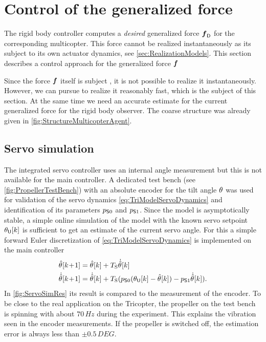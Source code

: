 \section{Control of the generalized force}\label{sec:RealizationForceVectorControl}
The rigid body controller computes a \textit{desired} generalized force $\genForceD$ for the corresponding multicopter.
This force cannot be realized instantaneously as its subject to its own actuator dynamics, see \autoref{sec:RealizationModels}.
This section describes a control approach for the generalized force $\genForce$

Since the force $\genForce$ itself is subject , it is not possible to realize it instantaneously.
However, we can pursue to realize it reasonably fast, which is the subject of this section.
At the same time we need an accurate estimate for the current generalized force for the rigid body observer.
The coarse structure was already given in \autoref{fig:StructureMulticopterAgent}.

\subsection{Servo simulation}
The integrated servo controller uses an internal angle measurement but this is not available for the main controller.
A dedicated test bench (see \autoref{fig:PropellerTestBench}) with an absolute encoder for the tilt angle $\aServo$ was used for validation of the servo dynamics \eqref{eq:TriModelServoDynamics} and identification of its parameters $\ServoParam[0]$ and $\ServoParam[1] $.
Since the model is asymptotically stable, a simple online simulation of the model with the known servo setpoint $\aServoU[][k]$ is sufficient to get an estimate of the current servo angle.
For this a simple forward Euler discretization of \eqref{eq:TriModelServoDynamics} is implemented on the main controller
\begin{subequations}\label{eq:ServoSimulator}
\begin{align}
 \aServoObs[][k\!+\!1] &= \aServoObs[][k] + \Ts \aServoObsd[][k]
\\
 \aServoObsd[][k\!+\!1] &= \aServoObsd[][k] + \Ts( \ServoParam[0] (\aServoU[][k] - \aServoObs[][k]) - \ServoParam[1] \aServoObsd[][k])
 .
\end{align}
\end{subequations}
In \autoref{fig:ServoSimRes} its result is compared to the measurement of the encoder.
To be close to the real application on the Tricopter, the propeller on the test bench is spinning with about $70\,\unit{Hz}$ during the experiment.
This explains the vibration seen in the encoder measurements.
If the propeller is switched off, the estimation error is always less than $\pm 0.5\,\unit{DEG}$.

